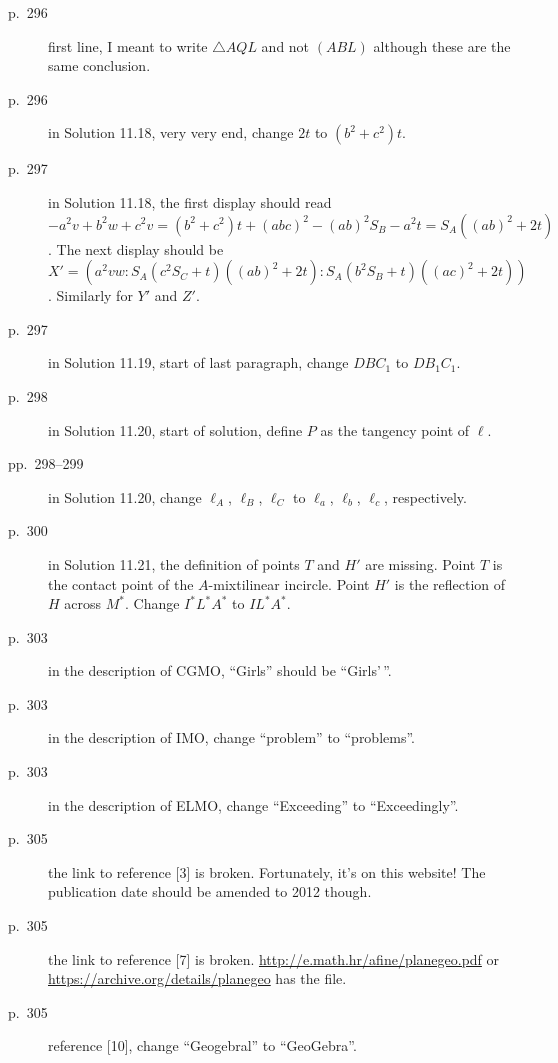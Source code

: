 \documentclass[11pt]{scrartcl}
\begin{document}
\begin{description}
\item[p.\  296] first line, I meant to write $\triangle{AQL}$ and not $(ABL)$
  although these are the same conclusion.
\item[p.\  296] in Solution 11.18, very very end, change $2t$ to $(b^2+c^2)t$.
\item[p.\  297] in Solution 11.18, the first display should read
  $-a^2v + b^2w + c^2v = (b^2+c^2)t + (abc)^2 - (ab)^2S_B - a^2t = S_A ((ab)^2 + 2t)$.
  The next display should be
  $X' = \left( a^2vw : S_A(c^2S_C+t)((ab)^2+2t) : S_A(b^2S_B+t)((ac)^2+2t) \right)$.
  Similarly for $Y'$ and $Z'$.
\item[p.\  297] in Solution 11.19, start of last paragraph, change $DBC_1$ to $DB_1C_1$.
\item[p.\  298] in Solution 11.20, start of solution, define $P$ as the tangency point of $\ell$.
\item[pp.\  298--299] in Solution 11.20, change $\ell_A$, $\ell_B$, $\ell_C$
  to $\ell_a$, $\ell_b$, $\ell_c$, respectively.
\item[p.\  300] in Solution 11.21, the definition of points $T$ and $H'$ are missing.
  Point $T$ is the contact point of the $A$-mixtilinear incircle.
  Point $H'$ is the reflection of $H$ across $M^\ast$.
  Change $I^\ast L^\ast A^\ast$ to $IL^\ast A^\ast$.
\item[p.\  303] in the description of CGMO, ``Girls'' should be ``Girls'\,''.
\item[p.\  303] in the description of IMO, change ``problem'' to ``problems''.
\item[p.\  303] in the description of ELMO, change ``Exceeding'' to ``Exceedingly''.
\item[p.\  305] the link to reference [3] is broken. Fortunately, it's on this website!
  The publication date should be amended to 2012 though.
\item[p.\  305] the link to reference [7] is broken. \url{http://e.math.hr/afine/planegeo.pdf}
  or \url{https://archive.org/details/planegeo} has the file.
\item[p.\  305] reference [10], change ``Geogebral'' to ``GeoGebra''.
\end{description}
\end{document}
